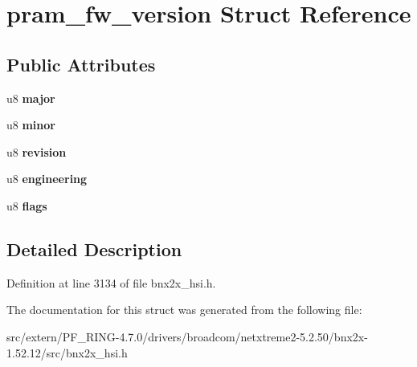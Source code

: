 \hypertarget{structpram__fw__version}{
\section{pram\_\-fw\_\-version Struct Reference}
\label{structpram__fw__version}
}
\subsection*{Public Attributes}
\begin{DoxyCompactItemize}
\item 
\hypertarget{structpram__fw__version_a647c4668a6bf5feaf9d945b2753c21e4}{
u8 {\bfseries major}}
\label{structpram__fw__version_a647c4668a6bf5feaf9d945b2753c21e4}

\item 
\hypertarget{structpram__fw__version_a11d874725de157359447e3f845eb51bf}{
u8 {\bfseries minor}}
\label{structpram__fw__version_a11d874725de157359447e3f845eb51bf}

\item 
\hypertarget{structpram__fw__version_af074223afacf5b4f6f7979e6a366e56f}{
u8 {\bfseries revision}}
\label{structpram__fw__version_af074223afacf5b4f6f7979e6a366e56f}

\item 
\hypertarget{structpram__fw__version_a283da3d846d5c47d536b40a635dc9d56}{
u8 {\bfseries engineering}}
\label{structpram__fw__version_a283da3d846d5c47d536b40a635dc9d56}

\item 
\hypertarget{structpram__fw__version_a7357c1d67baef96fa5918d7c7a689788}{
u8 {\bfseries flags}}
\label{structpram__fw__version_a7357c1d67baef96fa5918d7c7a689788}

\end{DoxyCompactItemize}


\subsection{Detailed Description}


Definition at line 3134 of file bnx2x\_\-hsi.h.



The documentation for this struct was generated from the following file:\begin{DoxyCompactItemize}
\item 
src/extern/PF\_\-RING-\/4.7.0/drivers/broadcom/netxtreme2-\/5.2.50/bnx2x-\/1.52.12/src/bnx2x\_\-hsi.h\end{DoxyCompactItemize}
